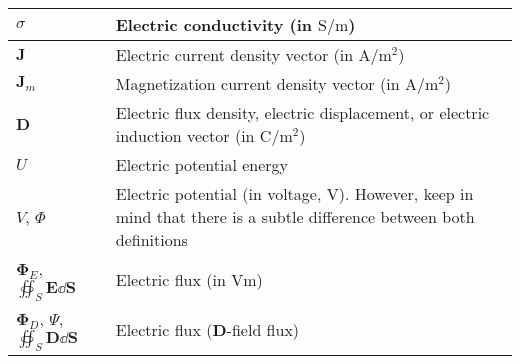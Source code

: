 \begin{xltabular}{\textwidth}{XX}
	\(\sigma\)                                                                                                                      & Electric conductivity (in \(\si{\siemens\per\meter}\))                                                                                                                                   \\ \hline
	\(\mathbf{J}\)                                                                                                                  & Electric current density vector (in \(\si{\ampere\per\square\meter}\))                                                                                                                   \\ \hline
	\(\mathbf{J}_m\)\cite{chengFieldWaveElectromagnetics1989}                                                                       & Magnetization current density vector (in \(\si{\ampere\per\meter\squared}\))                                                                                                             \\ \hline
	\(\mathbf{D}\)                                                                                                                  & Electric flux density, electric displacement, or electric induction vector (in \(\si{\coulomb\per\meter\squared}\))                                                                      \\ \hline
	\(U\)                                                                                                                           & Electric potential energy                                                                                                                                                                \\ \hline
	\(V\)\cite{wiki:electric-potential,chengFieldWaveElectromagnetics1989}, \(\Phi\)\cite{ramoFieldsWavesCommunication1994}         & Electric potential (in voltage, \(\si{\volt}\)). However, keep in mind that there is a subtle difference between both definitions \cite{stackexchange:electric-potential-vs-voltage}     \\ \hline
	\(\mathbf{\Phi}_E\)\cite{wiki:electric-flux}, \(\oiint_S \mathbf{E} \dd{\mathbf{S}}\)                                                    & Electric flux (in \(\si{\volt\meter}\))                                                                                                                                                \\ \hline
	\(\mathbf{\Phi}_D\)\cite{wiki:D-field-flux}, \(\varPsi\)\cite{ramoFieldsWavesCommunication1994}, \(\oiint_S \mathbf{D} \dd{\mathbf{S}}\) & Electric flux (\(\mathbf{D}\)-field flux)                                                                                                                                                \\ \hline

\end{xltabular}
